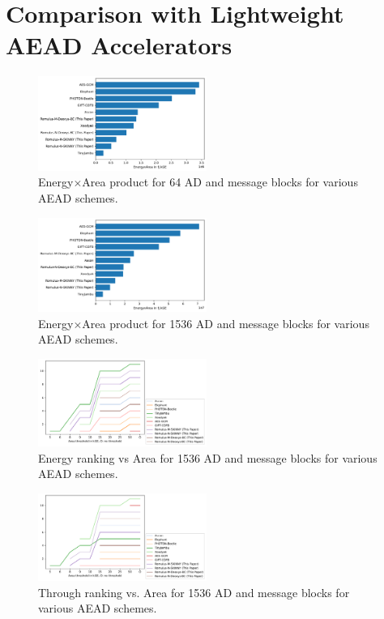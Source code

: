 \documentclass[conference]{IEEEtran}
\begin{document}
\section{Comparison with Lightweight AEAD Accelerators}


\begin{figure}[!h]
  \centering
  \includegraphics[width=0.49\textwidth]{figures/withM_energy_area64_bar_65.pdf}
  \caption{Energy$\times$Area product for 64 AD and message blocks for various AEAD schemes.}\label{fig:energy_area_64}
\end{figure}

\begin{figure}[!h]
  \centering
  \includegraphics[width=0.49\textwidth]{figures/withM_energy_area1536_bar_65.pdf}
  \caption{Energy$\times$Area product for 1536 AD and message blocks for various AEAD schemes.}\label{fig:energy_area_1536}
\end{figure}

\begin{figure}[!h]
  \centering
  \includegraphics[width=0.49\textwidth]{figures/withM_energy_area1536_rank_65.pdf}
  \caption{Energy ranking vs Area for 1536 AD and message blocks for various AEAD schemes.}\label{fig:thoughput_1536}
\end{figure}

\begin{figure}[!h]
  \centering
  \includegraphics[width=0.49\textwidth]{figures/withM_throughput1536_rank_65.pdf}
  \caption{Through ranking vs. Area for 1536 AD and message blocks for various AEAD schemes.}\label{fig:thoughput_1536}
\end{figure}
\end{document}
